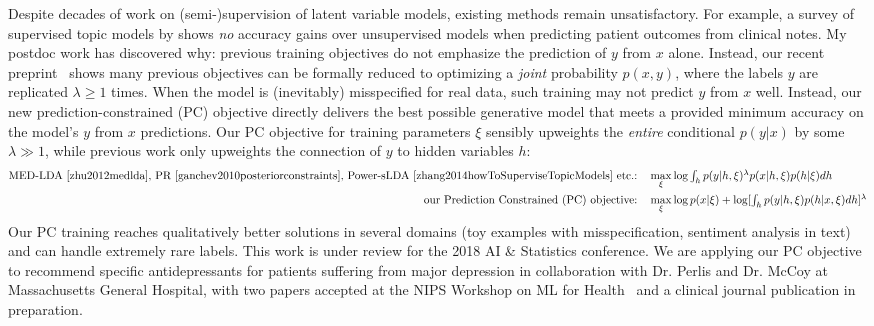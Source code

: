\documentclass[11pt,letterpaper]{article}
\begin{document}
Despite decades of work on (semi-)supervision of latent variable models, existing methods remain unsatisfactory. For example, a survey of supervised topic models by \cite{halpern2012comparison} shows \emph{no} accuracy gains over unsupervised models when predicting patient outcomes from clinical notes. 
My postdoc work has discovered why: previous training objectives do not emphasize the prediction of $y$ from $x$ alone. 
Instead, our recent preprint~\cite{hughes2017pc} shows many previous objectives \citep{blei2008sLDA,zhang2014howToSuperviseTopicModels,zhu2012medlda,ganchev2010posteriorconstraints} can be formally reduced to optimizing a \emph{joint} probability $p(x,y)$, where the labels $y$ are replicated $\lambda \geq 1$ times. When the model is (inevitably) misspecified for real data, 
such training may not predict $y$ from $x$ well.
Instead, our new prediction-constrained (PC) objective directly delivers the best possible generative model that meets a provided minimum accuracy on the model's $y$ from $x$ predictions.
Our PC objective for training parameters $\xi$ sensibly upweights the \emph{entire} conditional $p(y | x)$ by some $\lambda \gg 1$, while previous work only upweights the connection of $y$ to hidden variables $h$:
\begin{align}
\mbox{MED-LDA \cite{zhu2012medlda}, PR \cite{ganchev2010posteriorconstraints}, Power-sLDA \cite{zhang2014howToSuperviseTopicModels} etc.:}\quad
\max_{\xi} &\log \textstyle \int_{h} p(y | h, \xi)^{\lambda} p(x | h, \xi) p(h | \xi) d h
\notag \\ \notag
\mbox{our Prediction Constrained (PC) objective:}\quad
\max_{\xi} &\log p(x | \xi) + \log \textstyle [ \int_{h} p(y | h, \xi) p(h | x, \xi) d h ]^{\lambda}
\end{align}
Our PC training reaches qualitatively better solutions in several domains (toy examples with misspecification, sentiment analysis in text) and can handle extremely rare labels.
This work is under review for the 2018 AI \& Statistics conference. 
We are applying our PC objective to recommend specific antidepressants for patients suffering from major depression in collaboration with Dr. Perlis and Dr. McCoy at Massachusetts General Hospital, with two papers accepted at the NIPS Workshop on ML for Health~\citep{hughes2017clinicalPCsLDA, hughes2016clinicalSLDA} and a clinical journal publication in preparation.
\end{document}
